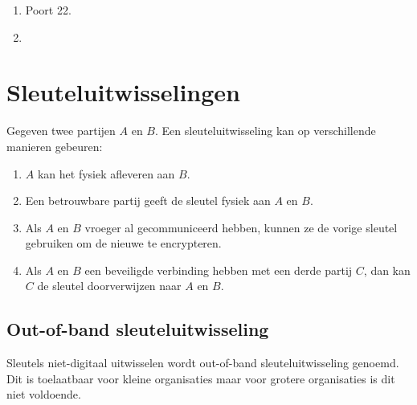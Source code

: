 \documentclass{report}
\begin{document}
\begin{enumerate}
		\item {}

		Poort 22.
		\item {}


	\end{enumerate}

	\section{Sleuteluitwisselingen}
	Gegeven twee partijen $A$ en $B$. Een sleuteluitwisseling kan op verschillende manieren gebeuren:
	\begin{enumerate}
		\item $A$ kan het fysiek afleveren aan $B$.
		\item Een betrouwbare partij geeft de sleutel fysiek aan $A$ en $B$.
		\item Als $A$ en $B$ vroeger al gecommuniceerd hebben, kunnen ze de vorige sleutel gebruiken om de nieuwe te encrypteren.
		\item Als $A$ en $B$ een beveiligde verbinding hebben met een derde partij $C$, dan kan $C$ de sleutel doorverwijzen naar $A$ en $B$.
	\end{enumerate}
	\subsection{Out-of-band sleuteluitwisseling}
	Sleutels niet-digitaal uitwisselen wordt out-of-band sleuteluitwisseling genoemd. Dit is toelaatbaar voor kleine organisaties maar voor grotere organisaties is dit niet voldoende.
\end{document}
